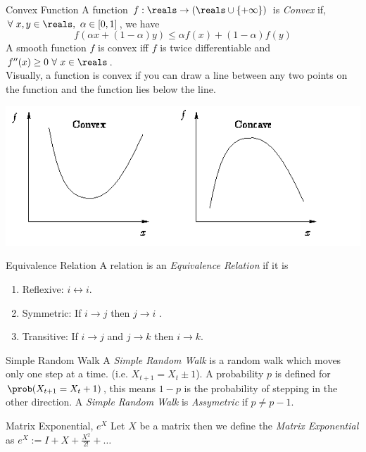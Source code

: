 \documentclass[11pt,a4paper]{article}
\begin{document}
\begin{definition}{Convex Function}
  A function $f:\reals\to(\reals\cup\{+\infty\})$ is \textit{Convex} if, $\forall\ x,y\in\reals,\ \alpha\in[0,1]$, we have
  \[ f(\alpha x+(1-\alpha)y)\leq\alpha f(x)+(1-\alpha)f(y) \]
  A smooth function $f$ is convex iff $f$ is twice differentiable and $f''(x)\geq0\ \forall\ x\in\reals$.\\
  Visually, a function is convex if you can draw a line between any two points on the function and the function lies below the line.
  \begin{center}
    \includegraphics[scale=.5]{convex_concave.png}
  \end{center}
\end{definition}

\begin{definition}{Equivalence Relation}
  A relation is an \textit{Equivalence Relation} if it is
  \begin{enumerate}
    \item Reflexive: $i\leftrightarrow i$.
    \item Symmetric: If $i\to j$ then $j\to i$ .
    \item Transitive: If $i\to j$ and $j\to k$ then $i\to k$.
  \end{enumerate}
\end{definition}

\begin{definition}{Simple Random Walk}
  A \textit{Simple Random Walk} is a random walk which moves only one step at a time. (i.e. $X_{t+1}=X_t\pm1$). A probability $p$ is defined for $\prob(X_{t+1}=X_t+1)$, this means $1-p$ is the probability of stepping in the other direction. A \textit{Simple Random Walk} is \textit{Assymetric} if $p\neq p-1$.
\end{definition}

\begin{definition}{Matrix Exponential, $e^X$}
  Let $X$ be a matrix then we define the \textit{Matrix Exponential} as $e^X:=I+X+\frac{X^2}{2!}+\dots$
\end{definition}
\end{document}
